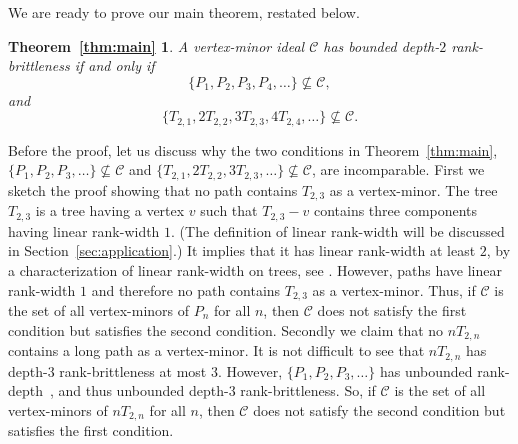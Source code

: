 \documentclass[11pt]{article}
\newtheorem*{thm:main}{Theorem~\ref{thm:main}}
\begin{document}
	We are ready to prove our main theorem, restated below.
	\begin{thm:main}
	A vertex-minor ideal $\mathcal{C}$ has bounded depth-$2$ rank-brittleness if and only if 
		\[ \{P_1, P_2, P_3, P_4, \ldots \}\nsubseteq \mathcal{C}, \]
		and
		\[ \{T_{2,1}, 2T_{2,2}, 3T_{2,3}, 4T_{2,4}, \ldots \}\nsubseteq \mathcal{C}. \]
	\end{thm:main}
	
        Before the proof, let us discuss why
        the two conditions in Theorem~\ref{thm:main}, 
      $\{P_1, P_2, P_3, \ldots \}\not\subseteq \mathcal C$		and
      $\{T_{2,1}, 2T_{2,2}, 3T_{2,3}, \ldots \}\not\subseteq \mathcal C$, are incomparable.
      First we sketch the proof showing 
      that no path contains $T_{2,3}$ as a vertex-minor.
      The tree $T_{2,3}$ is a tree having a vertex $v$ such that $T_{2,3}-v$ contains three components having linear rank-width $1$. 
      (The definition of linear rank-width will be discussed in Section~\ref{sec:application}.)
      It implies that it has linear rank-width at least $2$,
      by a characterization of linear rank-width on trees, see \cite{AdlerK2015, AdlerKK2017}.
      However, paths have linear rank-width $1$ and therefore
      no path contains $T_{2,3}$ as a vertex-minor.
      Thus, if $\mathcal C$ is the set of all vertex-minors of $P_n$ for all $n$, then $\mathcal C$ does not satisfy the first condition but satisfies the second condition.
      Secondly we claim that no $nT_{2,n}$ contains a long path as a vertex-minor.
      It is not difficult to see that $nT_{2,n}$ has depth-$3$ rank-brittleness at most $3$. 
%
%
%
%
%
      However, $\{P_1, P_2, P_3, \ldots \}$ has unbounded rank-depth~\cite{DKO2019}, and thus unbounded depth-$3$ rank-brittleness.
      So, if $\mathcal C$ is the set of all vertex-minors of $nT_{2,n}$ for all $n$,
      then $\mathcal C$ does not satisfy the second condition but satisfies the first condition.
\end{document}
